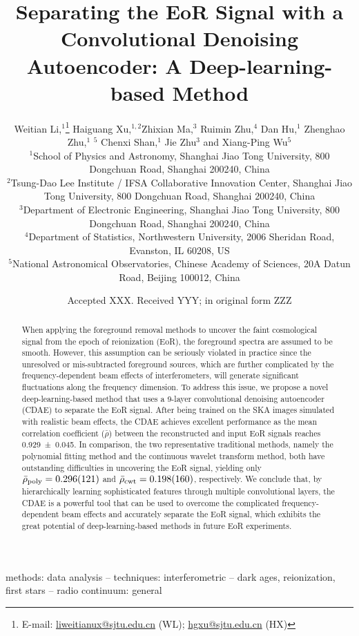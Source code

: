 \documentclass[fleqn,usenatbib]{mnras}
\title[EoR Signal Separation with a CDAE]{%
  Separating the EoR Signal with a Convolutional Denoising Autoencoder:
  A Deep-learning-based Method
}
\author[Li~et~al.]{%
Weitian Li,$^{1}$\thanks{E-mail:
  \href{mailto:liweitianux@sjtu.edu.cn}{liweitianux@sjtu.edu.cn} (WL);
  \href{mailto:hgxu@sjtu.edu.cn}{hgxu@sjtu.edu.cn} (HX)}
Haiguang Xu,$^{1,2}$\footnotemark[1]
Zhixian Ma,$^{3}$
Ruimin Zhu,$^{4}$
Dan Hu,$^{1}$
Zhenghao Zhu,$^{1}$
\newauthor  %
\editone{Junhua Gu,}$^{5}$
Chenxi Shan,$^{1}$
Jie Zhu$^{3}$
and
Xiang-Ping Wu$^{5}$
\\
$^{1}${School of Physics and Astronomy,
  Shanghai Jiao Tong University,
  800 Dongchuan Road, Shanghai 200240, China} \\
$^{2}${Tsung-Dao Lee Institute / IFSA Collaborative Innovation Center,
  Shanghai Jiao Tong University,
  800 Dongchuan Road, Shanghai 200240, China} \\
$^{3}${Department of Electronic Engineering,
  Shanghai Jiao Tong University,
  800 Dongchuan Road, Shanghai 200240, China} \\
$^{4}${Department of Statistics,
  Northwestern University,
  2006 Sheridan Road, Evanston, IL 60208, US} \\
$^{5}${National Astronomical Observatories,
  Chinese Academy of Sciences,
  20A Datun Road, Beijing 100012, China}
}
\date{Accepted XXX. Received YYY; in original form ZZZ}
\newcommand{\R}[1]{\mathrm{#1}}
\newcommand{\editone}[1]{{\leavevmode\color{cyan}#1}}
\begin{document}
\label{firstpage}
\pagerange{\pageref{firstpage}--\pageref{lastpage}}
\maketitle

%
%
\begin{abstract}
When applying the foreground removal methods to uncover the \editone{%
faint cosmological signal from the epoch of reionization (EoR)},
the foreground spectra are assumed to be smooth.
However, this assumption can be seriously violated in practice since
the unresolved or mis-subtracted foreground sources, which are further
complicated by the frequency-dependent beam effects of interferometers,
will generate significant fluctuations along the frequency dimension.
To address this issue, we propose a novel deep-learning-based method
that uses a 9-layer convolutional denoising autoencoder (CDAE) to
separate the EoR signal.
After being trained on the SKA images simulated with realistic beam
effects, the CDAE achieves excellent performance as the mean correlation
coefficient ($\bar{\rho}$) between the reconstructed and input EoR
signals reaches \editone{\num{0.929 +- 0.045}}.
In comparison,
\editone{%
the two representative traditional methods, namely the polynomial
fitting method and the continuous wavelet transform method, both have
outstanding difficulties in uncovering the EoR signal, yielding only
$\bar{\rho}_{\R{poly}} = \num{0.296 +- 0.121}$ and
$\bar{\rho}_{\R{cwt}} = \num{0.198 +- 0.160}$, respectively.} %
We conclude that, by hierarchically learning sophisticated features
through multiple convolutional layers, the CDAE is a powerful tool that
can be used to overcome the complicated frequency-dependent beam effects
and accurately separate the EoR signal, which exhibits the great
potential of deep-learning-based methods in future EoR experiments.
\end{abstract}

\begin{keywords}
methods: data analysis --
techniques: interferometric --
dark ages, reionization, first stars --
radio continuum: general
\end{keywords}


\end{document}
